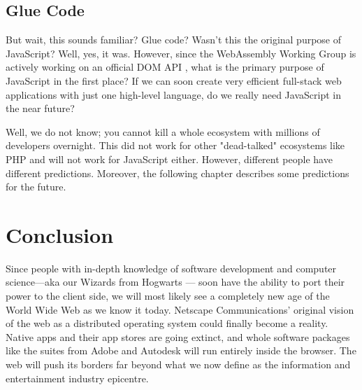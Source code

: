 \documentclass[10pt]{article}
\begin{document}
\begin{sloppypar}
  \subsection{Glue Code}
  \label{sec:glue-code}

  But wait, this sounds familiar? Glue code? Wasn’t this the original purpose of JavaScript? Well, yes, it was. However, since the WebAssembly Working Group is actively working on an official DOM API \citep{mozilla_webassemblymodule_2023}, what is the primary purpose of JavaScript in the first place? If we can soon create very efficient full-stack web applications with just one high-level language, do we really need JavaScript in the near future?

  Well, we do not know; you cannot kill a whole ecosystem with millions of developers overnight. This did not work for other "dead-talked" ecosystems like PHP and will not work for JavaScript either. However, different people have different predictions. Moreover, the following chapter describes some predictions for the future.

  \section{Conclusion}
  \label{sec:conclusion}

  Since people with in-depth knowledge of software development and computer science—aka our Wizards from Hogwarts — soon have the ability to port their power to the client side, we will most likely see a completely new age of the World Wide Web as we know it today. Netscape Communications’ original vision of the web as a distributed operating system could finally become a reality. Native apps and their app stores are going extinct, and whole software packages like the suites from Adobe and Autodesk will run entirely inside the browser. The web will push its borders far beyond what we now define as the information and entertainment industry epicentre.


\end{sloppypar}
\end{document}
